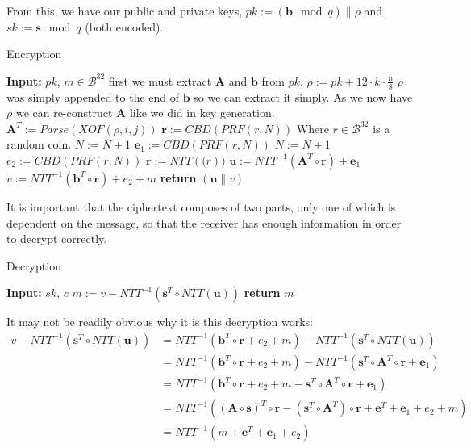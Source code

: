 \documentclass[a4paper, 10pt]{article}
\theoremstyle{definition}
\begin{document}
From this, we have our public and private keys, $pk:=(\mathbf{b}\mod{q})\| \rho $ and $sk:=\mathbf{s}\mod{q}$ (both encoded).

\begin{algorithm}[H]
    \caption{Encryption}
    \begin{algorithmic}[1]
    \State \textbf{Input:} $pk$, $m \in \mathcal{B}^{32}$
    \State first we must extract $\mathbf{A}$ and $\mathbf{b}$ from $pk$.
    \State $\rho:=pk+12\cdot k\cdot \frac{n}{8}$ \Comment $\rho$ was simply appended to the end of $\mathbf{b}$ so we can extract it simply. As we now have $\rho$ we can re-construct $\mathbf{A}$ like we did in key generation.
            \State $\mathbf{A}^T:=Parse(XOF(\rho , i, j))$ 
        \EndFor
    \EndFor
        \State $\mathbf{r}:=CBD(PRF(r ,N))$ \Comment Where $r \in \mathcal{B}^{32}$ is a random coin.
        \State $N:=N+1$
    \EndFor
        \State $\mathbf{e}_1:=CBD(PRF(r ,N))$
        \State $N:=N+1$
    \EndFor
    \State $e_2:=CBD(PRF(r, N))$
    \State $\mathbf{r}:=NTT(\mathbf(r))$
    \State $\mathbf{u}:=NTT^{-1}(\mathbf{A}^T\circ \mathbf{r})+\mathbf{e}_1$
    \State $v:=NTT^{-1}(\mathbf{b}^T\circ \mathbf{r})+e_2 + m $
    \State \textbf{return} $(\mathbf{u}\|v)$
    \end{algorithmic}
\end{algorithm}

It is important that the ciphertext composes of two parts, only one of which is dependent on the message, so that the receiver has enough information in order to decrypt correctly.

\begin{algorithm}[H]
    \caption{Decryption}
    \begin{algorithmic}[1]
    \State \textbf{Input:} $sk$, $c$
    \State $m:=v-NTT^{-1}(\mathbf{s}^T\circ NTT(\mathbf{u}))$
    \State \textbf{return} $m$
    \end{algorithmic}
\end{algorithm}

It may not be readily obvious why it is this decryption works:
\begin{align*}
    v-NTT^{-1}(\mathbf{s}^T\circ NTT(\mathbf{u})) &= NTT^{-1}(\mathbf{b}^T\circ \mathbf{r}+e_2+m)-NTT^{-1}(\mathbf{s}^T\circ NTT(\mathbf{u}))\\
    &=NTT^{-1}(\mathbf{b}^T\circ \mathbf{r}+e_2+m)-NTT^{-1}(\mathbf{s}^T\circ \mathbf{A}^T\circ \mathbf{r}+\mathbf{e}_1)\\
    &=NTT^{-1}(\mathbf{b}^T\circ \mathbf{r}+e_2+m-\mathbf{s}^T\circ \mathbf{A}^T\circ \mathbf{r}+\mathbf{e}_1)\\
    &=NTT^{-1}(( \mathbf{A} \circ \mathbf{s})^T \circ \mathbf{r} - (\mathbf{s}^T \circ \mathbf{A} ^T) \circ \mathbf{r} + \mathbf{e} ^T + \mathbf{e}_1 + e_2 + m)\\
    &=NTT^{-1}(m+\mathbf{e}^T+\mathbf{e}_1+e_2)
\end{align*}
\end{document}
